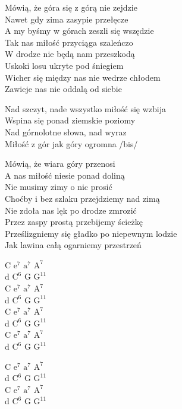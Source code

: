\begin{text}
    Mówią, że góra się z górą nie zejdzie\\
    Nawet gdy zima zasypie przełęcze\\
    A my byśmy w górach zeszli się wszędzie\\
    Tak nas miłość przyciąga szaleńczo\\
    \vin W drodze nie będą nam przeszkodą\\
    \vin Uskoki losu ukryte pod śniegiem\\
    \vin Wicher się między nas nie wedrze chłodem\\
    \vin Zawieje nas nie oddalą od siebie

    \vin Nad szczyt, nade wszystko miłość się wzbija\\
    \vin Wspina się ponad ziemskie poziomy\\
    \vin Nad górnolotne słowa, nad wyraz\\
    \vin Miłość z gór jak góry ogromna /bis/

    Mówią, że wiara góry przenosi\\
    A nas miłość niesie ponad doliną\\
    Nie musimy zimy o nic prosić\\
    Choćby i bez szlaku przejdziemy nad zimą\\
    \vin Nie zdoła nas lęk po drodze zmrozić\\
    \vin Przez zaspy prostą przebijemy ścieżkę\\
    \vin Prześlizgniemy się gładko po niepewnym lodzie\\
    \vin Jak lawina całą ogarniemy przestrzeń
\end{text}
\begin{chord}
    C $\mathrm{e^{7}}$ $\mathrm{a^7}$ $\mathrm{A^7}$\\
    d $\mathrm{C^6}$ G $\mathrm{G^{11}}$\\
    C $\mathrm{e^{7}}$ $\mathrm{a^7}$ $\mathrm{A^7}$\\
    d $\mathrm{C^6}$ G $\mathrm{G^{11}}$\\
    C $\mathrm{e^{7}}$ $\mathrm{a^7}$ $\mathrm{A^7}$\\
    d $\mathrm{C^6}$ G $\mathrm{G^{11}}$\\
    C $\mathrm{e^{7}}$ $\mathrm{a^7}$ $\mathrm{A^7}$\\
    d $\mathrm{C^6}$ G $\mathrm{G^{11}}$

    C $\mathrm{e^{7}}$ $\mathrm{a^7}$ $\mathrm{A^7}$\\
    d $\mathrm{C^6}$ G $\mathrm{G^{11}}$\\
    C $\mathrm{e^{7}}$ $\mathrm{a^7}$ $\mathrm{A^7}$\\
    d $\mathrm{C^6}$ G $\mathrm{G^{11}}$
\end{chord}

